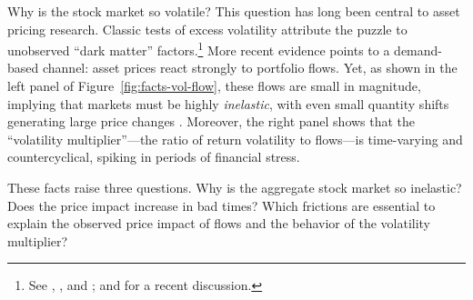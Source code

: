 \noindent Why is the stock market so volatile? This question has long been central to asset pricing research. Classic tests of excess volatility attribute the puzzle to unobserved ``dark matter'' factors.\footnote{See \citet{leroy1981present}, \citet{shiller1981,shiller1992market}, and \citet{cochrane1992explaining}; and \citet{chen2024measuring} for a recent discussion.} More recent evidence points to a demand-based channel: asset prices react strongly to portfolio flows. Yet, as shown in the left panel of Figure~\ref{fig:facts-vol-flow}, these flows are small in magnitude, implying that markets must be highly \emph{inelastic}, with even small quantity shifts generating large price changes \citep{gabaix2020search}. Moreover, the right panel shows that the ``volatility multiplier''—the ratio of return volatility to flows—is time-varying and countercyclical, spiking in periods of financial stress.

These facts raise three questions. Why is the aggregate stock market so inelastic? Does the price impact increase in bad times? Which frictions are essential to explain the observed price impact of flows and the behavior of the volatility multiplier?



